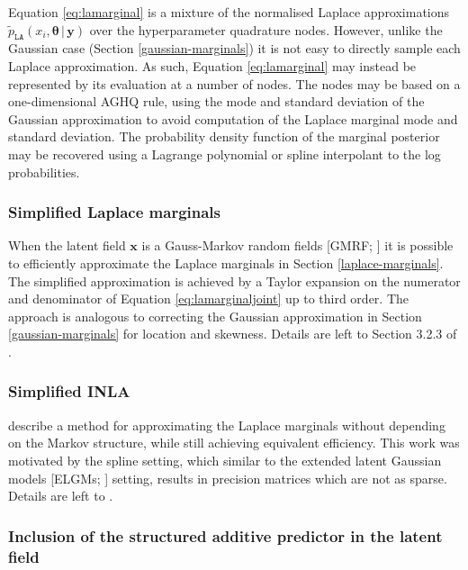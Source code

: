 \documentclass[a4paper, nobind]{templates/ociamthesis}
\begin{document}
Equation \eqref{eq:lamarginal} is a mixture of the normalised Laplace approximations \(\tilde p_\texttt{LA}(x_i, \boldsymbol{\mathbf{\theta}} \, | \, \mathbf{y})\) over the hyperparameter quadrature nodes.
However, unlike the Gaussian case (Section \ref{gaussian-marginals}) it is not easy to directly sample each Laplace approximation.
As such, Equation \eqref{eq:lamarginal} may instead be represented by its evaluation at a number of nodes.
The nodes may be based on a one-dimensional AGHQ rule, using the mode and standard deviation of the Gaussian approximation to avoid computation of the Laplace marginal mode and standard deviation.
The probability density function of the marginal posterior may be recovered using a Lagrange polynomial or spline interpolant to the log probabilities.

\hypertarget{simplified-laplace-marginals}{%
\subsubsection{Simplified Laplace marginals}\label{simplified-laplace-marginals}}

When the latent field \(\mathbf{x}\) is a Gauss-Markov random fields {[}GMRF; \textcite{rue2005gaussian}{]} it is possible to efficiently approximate the Laplace marginals in Section \ref{laplace-marginals}.
The simplified approximation is achieved by a Taylor expansion on the numerator and denominator of Equation \eqref{eq:lamarginaljoint} up to third order.
The approach is analogous to correcting the Gaussian approximation in Section \ref{gaussian-marginals} for location and skewness.
Details are left to Section 3.2.3 of \textcite{rue2009approximate}.

\hypertarget{simplified-inla}{%
\subsubsection{Simplified INLA}\label{simplified-inla}}

\textcite{wood2020simplified} describe a method for approximating the Laplace marginals without depending on the Markov structure, while still achieving equivalent efficiency.
This work was motivated by the spline setting, which similar to the extended latent Gaussian models {[}ELGMs; \textcite{stringer2022fast}{]} setting, results in precision matrices which are not as sparse.
Details are left to \textcite{wood2020simplified}.

\hypertarget{inclusion-of-the-structured-additive-predictor-in-the-latent-field}{%
\subsubsection{Inclusion of the structured additive predictor in the latent field}\label{inclusion-of-the-structured-additive-predictor-in-the-latent-field}}
\end{document}
